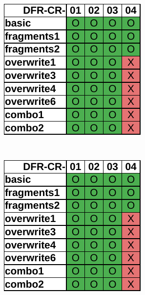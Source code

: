 \begin{figure}
\begin{subfigure}{0.3\linewidth}
    \end{subfigure}
    \begin{subfigure}{0.3\linewidth}
        \includegraphics[width=\linewidth]{fig/axiom_results_ntfs.pdf}
    \end{subfigure}~~
    \begin{subfigure}{0.3\linewidth}
        \includegraphics[width=\linewidth]{fig/recuva_results_ntfs.pdf}

\end{subfigure}
\end{figure}
